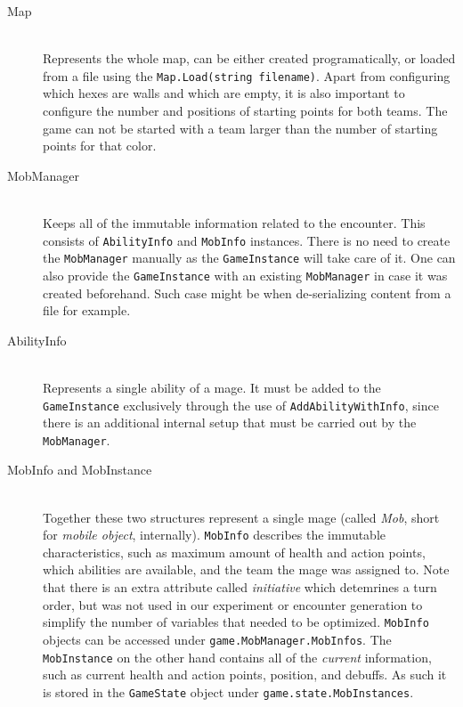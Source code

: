 \begin{description}
	\item[Map] \hfill \\
	Represents the whole map, can be either created programatically, or loaded from a file using the \verb|Map.Load(string filename)|. Apart from configuring which hexes are walls and which are empty, it is also important to configure the number and positions of starting points for both teams. The game can not be started with a team larger than the number of starting points for that color.
	
	\item[MobManager] \hfill \\
	Keeps all of the immutable information related to the encounter. This consists of \verb|AbilityInfo| and \verb|MobInfo| instances. There is no need to create the \verb|MobManager| manually as the \verb|GameInstance| will take care of it. One can also provide the \verb|GameInstance| with an existing \verb|MobManager| in case it was created beforehand. Such case might be when de-serializing content from a file for example.
	
	\item[AbilityInfo] \hfill \\
	Represents a single ability of a mage. It must be added to the \verb|GameInstance| exclusively through the use of \verb|AddAbilityWithInfo|, since there is an additional internal setup that must be carried out by the \verb|MobManager|.
	
	\item[MobInfo and MobInstance] \hfill \\
	Together these two structures represent a single mage (called \emph{Mob}, short for \emph{mobile object}, internally). \verb|MobInfo| describes the immutable characteristics, such as maximum amount of health and action points, which abilities are available, and the team the mage was assigned to. Note that there is an extra attribute called \emph{initiative} which detemrines a turn order, but was not used in our experiment or encounter generation to simplify the number of variables that needed to be optimized. \verb|MobInfo| objects can be accessed under \verb|game.MobManager.MobInfos|. The \verb|MobInstance| on the other hand contains all of the \emph{current} information, such as current health and action points, position, and debuffs. As such it is stored in the \verb|GameState| object under \verb|game.state.MobInstances|.
\end{description}

